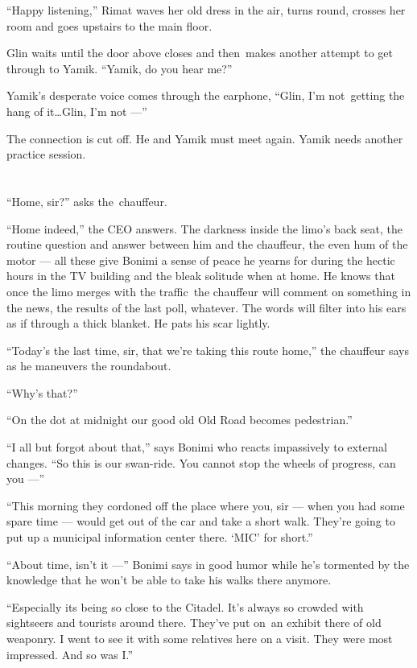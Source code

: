 \documentclass[twoside,11pt]{book}
\begin{document}
``Happy listening,'' Rimat waves her old dress in the air, turns round, crosses her room and
goes upstairs to the main floor.

Glin waits until the door above closes and then~makes another attempt to get through to Yamik. ``Yamik, do
you hear me?''

Yamik's desperate voice comes through the earphone, ``Glin, I'm not~getting the hang of it{\ldots}Glin, I'm
not ---''

The connection is cut off. He and Yamik must meet again. Yamik needs another practice session.



\chapter{}

``Home, sir?'' asks the~chauffeur.

``Home indeed,'' the CEO answers. The darkness inside{ }the limo's back seat,
the routine question and answer between him and the chauffeur, the even hum of the motor --- all these give Bonimi a
sense of peace he yearns for during the hectic hours in the TV building and the{ }bleak solitude when
at home. He knows that once the limo merges with the traffic~the chauffeur will comment on something in the news, the
results of the last poll, whatever.  The words will filter into his ears as if through a thick blanket. He pats his
scar lightly.

``Today's the last time, sir, that we're taking this route home,'' the chauffeur says as he
maneuvers the roundabout.

``Why's that?''

``On the dot at midnight our good old Old Road becomes pedestrian.''

``I all but forgot about that,'' says Bonimi who reacts impassively to external changes.
``So this is our swan-ride. You cannot stop the wheels of progress, can you ---''

``This morning they cordoned off the place where you, sir --- when you had some spare time --- would get out of
the car and take a short walk. They're going to put up a municipal information center there. `MIC' for
short.''

``About time, isn't it ---'' Bonimi says in good humor while he's tormented by the knowledge that he won't
be able to take his walks there anymore. { }

``Especially its being so close to the Citadel. It's always so crowded with sightseers and tourists around
there. They've put on~an exhibit there of old weaponry. I went to see it with some relatives here on a visit. They were
most impressed. And so was I.''
\end{document}
